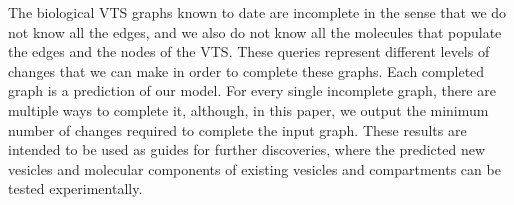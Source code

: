The biological VTS graphs known to date are incomplete in the sense that we do not know all the edges, and we also do not know all the molecules that populate the edges and the nodes of the VTS.
These queries represent different levels of changes that we can make in order to complete these graphs.
%
Each completed graph is a prediction of our model. 
%
For every single incomplete graph, there are multiple ways to complete it, although, in this paper, we output the minimum number of changes required to complete the input graph. 
%
These results are intended to be used as guides for further discoveries, where the predicted new vesicles and molecular components of existing vesicles and compartments can be tested experimentally.
%
%

